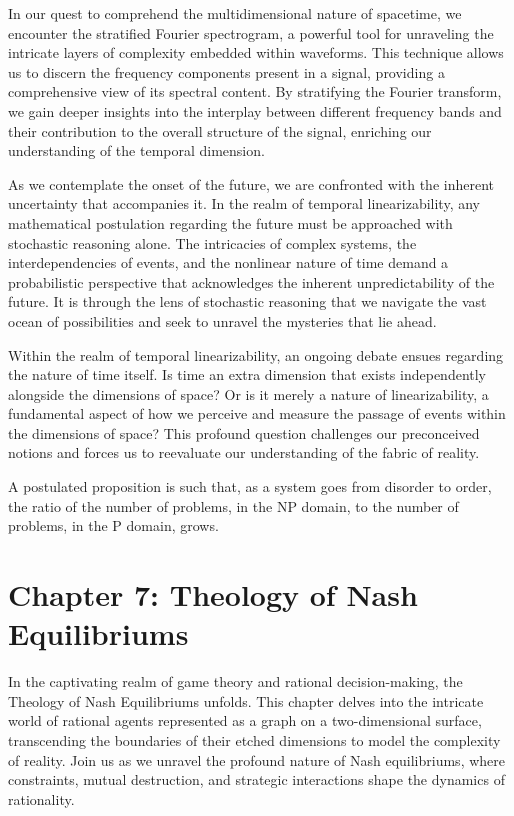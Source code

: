 \documentclass[ebook,12pt,oneside,openany]{memoir}
\begin{document}
\indent In our quest to comprehend the multidimensional nature of spacetime, we encounter the stratified Fourier spectrogram, a powerful tool for unraveling the intricate layers of complexity embedded within waveforms. This technique allows us to discern the frequency components present in a signal, providing a comprehensive view of its spectral content. By stratifying the Fourier transform, we gain deeper insights into the interplay between different frequency bands and their contribution to the overall structure of the signal, enriching our understanding of the temporal dimension.

\indent As we contemplate the onset of the future, we are confronted with the inherent uncertainty that accompanies it. In the realm of temporal linearizability, any mathematical postulation regarding the future must be approached with stochastic reasoning alone. The intricacies of complex systems, the interdependencies of events, and the nonlinear nature of time demand a probabilistic perspective that acknowledges the inherent unpredictability of the future. It is through the lens of stochastic reasoning that we navigate the vast ocean of possibilities and seek to unravel the mysteries that lie ahead.

\indent Within the realm of temporal linearizability, an ongoing debate ensues regarding the nature of time itself. Is time an extra dimension that exists independently alongside the dimensions of space? Or is it merely a nature of linearizability, a fundamental aspect of how we perceive and measure the passage of events within the dimensions of space? This profound question challenges our preconceived notions and forces us to reevaluate our understanding of the fabric of reality.

\indent A postulated proposition is such that, as a system goes from disorder to order, the ratio of the number of problems, in the NP domain, to the number of problems, in the P domain, grows.
\chapter*{Chapter 7: Theology of Nash Equilibriums}


\indent \indent In the captivating realm of game theory and rational decision-making, the Theology of Nash Equilibriums unfolds. This chapter delves into the intricate world of rational agents represented as a graph on a two-dimensional surface, transcending the boundaries of their etched dimensions to model the complexity of reality. Join us as we unravel the profound nature of Nash equilibriums, where constraints, mutual destruction, and strategic interactions shape the dynamics of rationality.
\end{document}

